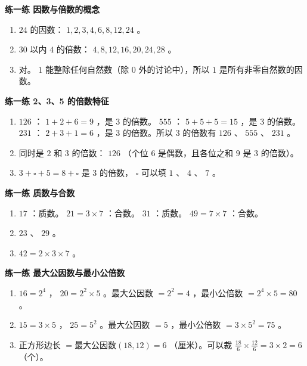 \begin{answer}


\textbf{练一练 因数与倍数的概念}

\begin{enumerate}
  \item $24$ 的因数： $1, 2, 3, 4, 6, 8, 12, 24$ 。
  \item $30$ 以内 $4$ 的倍数： $4, 8, 12, 16, 20, 24, 28$ 。
  \item 对。 $1$ 能整除任何自然数（除 $0$ 外的讨论中），所以 $1$ 是所有非零自然数的因数。
\end{enumerate}


\textbf{练一练 2、3、5 的倍数特征}

\begin{enumerate}
  \item $126$ ： $1 + 2 + 6 = 9$ ，是 $3$ 的倍数。 $555$ ： $5 + 5 + 5 = 15$ ，是 $3$ 的倍数。 $231$ ： $2 + 3 + 1 = 6$ ，是 $3$ 的倍数。所以 $3$ 的倍数有 $126$ 、 $555$ 、 $231$ 。
  \item 同时是 $2$ 和 $3$ 的倍数： $126$ （个位 $6$ 是偶数，且各位之和 $9$ 是 $3$ 的倍数）。
  \item $3 + \square + 5 = 8 + \square$ 是 $3$ 的倍数， $\square$ 可以填 $1$ 、 $4$ 、 $7$ 。
\end{enumerate}


\textbf{练一练 质数与合数}

\begin{enumerate}
  \item $17$ ：质数。 $21 = 3 \times 7$ ：合数。 $31$ ：质数。 $49 = 7 \times 7$ ：合数。
  \item $23$ 、 $29$ 。
  \item $42 = 2 \times 3 \times 7$ 。
\end{enumerate}


\textbf{练一练 最大公因数与最小公倍数}

\begin{enumerate}
  \item $16 = 2^4$ ， $20 = 2^2 \times 5$ 。最大公因数 $= 2^2 = 4$ ，最小公倍数 $= 2^4 \times 5 = 80$ 。
  \item $15 = 3 \times 5$ ， $25 = 5^2$ 。最大公因数 $= 5$ ，最小公倍数 $= 3 \times 5^2 = 75$ 。
  \item 正方形边长 $= \text{最大公因数}(18, 12) = 6$ （厘米）。可以裁 $\frac{18}{6} \times \frac{12}{6} = 3 \times 2 = 6$ （个）。
\end{enumerate}


\end{answer}

